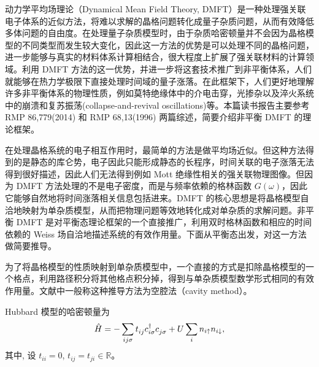 动力学平均场理论（Dynamical Mean Field Theory, DMFT）是一种处理强关联电子体系的近似方法，将难以求解的晶格问题转化成量子杂质问题，从而有效降低多体问题的自由度。在处理量子杂质模型时，由于杂质哈密顿量并不会因为晶格模型的不同类型而发生较大变化，因此这一方法的优势是可以处理不同的晶格问题，进一步能够与真实的材料体系计算相结合，很大程度上扩展了强关联材料的计算领域。利用 DMFT 方法的这一优势，并进一步将这套技术推广到非平衡体系，人们就能够在热力学极限下直接处理时间域的量子涨落。在此框架下，人们更好地理解许多非平衡体系的物理性质，例如莫特绝缘体中的介电击穿，光掺杂以及淬火系统中的崩溃和复苏振荡(collapse-and-revival oscillations)等。本篇读书报告主要参考 RMP 86,779(2014) 和 RMP 68,13(1996) 两篇综述，简要介绍非平衡 DMFT 的理论框架。

在处理晶格系统的电子相互作用时，最简单的方法是做平均场近似。但这种方法得到的是静态的库仑势，电子因此只能形成静态的长程序，时间关联的电子涨落无法得到很好描述，因此人们无法得到例如 Mott 绝缘性相关的强关联物理图像。但因为 DMFT 方法处理的不是电子密度，而是与频率依赖的格林函数 $G(\omega)$，因此它能够自然地将时间涨落相关信息包括进来。DMFT 的核心思想是将晶格模型自洽地映射为单杂质模型，从而把物理问题等效地转化成对单杂质的求解问题。非平衡 DMFT 是对平衡态理论框架的一个直接推广，利用双时格林函数和相应的时间依赖的 Weiss 场自洽地描述系统的有效作用量。下面从平衡态出发，对这一方法做简要推导。

为了将晶格模型的性质映射到单杂质模型中，一个直接的方式是扣除晶格模型的一个格点，利用路径积分将其他格点积分掉，得到与单杂质模型数学形式相同的有效作用量。文献中一般称这种推导方法为空腔法（cavity method）。

Hubbard 模型的哈密顿量为
\begin{equation}
    \hat{H}=-\sum_{ij\sigma}t_{ij}^{ }c_{i\sigma}^\dagger c_{j\sigma}^{ }+U\sum_i n_{i\uparrow} n_{i\downarrow},
\end{equation}
其中, 设 $t_{ii}=0$, $t_{ij}=t_{ji}\in \mathbb{R}$。

